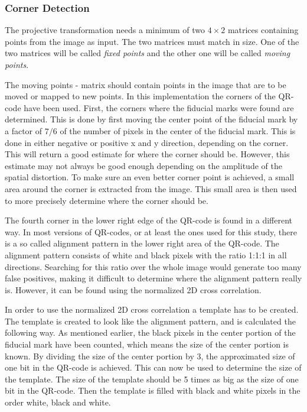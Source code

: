 \documentclass[12pt,a4paper]{article}
\begin{document}
\subsubsection{Corner Detection}
The projective transformation needs a minimum of two $4\times2$ matrices containing points from the image as input. The two matrices must match in size. One of the two matrices will be called \textit{fixed points} and the other one will be called \textit{moving points}.

The moving points - matrix should contain points in the image that are to be moved or mapped to new points. In this implementation the corners of the QR-code have been used. First, the corners where the fiducial marks were found are determined. This is done by first moving the center point of the fiducial mark by a factor of $7/6$ of the number of pixels in the center of the fiducial mark. This is done in either negative or positive x and y direction, depending on the corner. This will return a good estimate for where the corner should be. However, this estimate may not always be good enough depending on the amplitude of the spatial distortion. To make sure an even better corner point is achieved, a small area around the corner is extracted from the image. This small area is then used to more precisely determine where the corner should be. 

The fourth corner in the lower right edge of the QR-code is found in a different way. In most versions of QR-codes, or at least the ones used for this study, there is a so called alignment pattern in the lower right area of the QR-code. The alignment pattern consists of white and black pixels with the ratio 1:1:1 in all directions. Searching for this ratio over the whole image would generate too many false positives, making it difficult to determine where the alignment pattern really is. However, it can be found using the normalized 2D cross correlation. 

In order to use the normalized 2D cross correlation a template has to be created. The template is created to look like the alignment pattern, and is calculated the following way. As mentioned earlier, the black pixels in the center portion of the fiducial mark have been counted, which means the size of the center portion is known. By dividing the size of the center portion by 3, the approximated size of one bit in the QR-code is achieved. This can now be used to determine the size of the template. The size of the template should be 5 times as big as the size of one bit in the QR-code. Then the template is filled with black and white pixels in the order white, black and white. 
\end{document}
